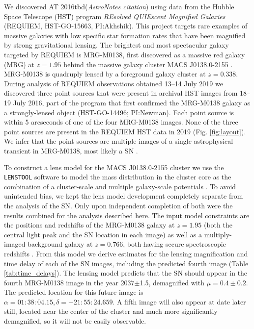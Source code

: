 \documentclass[12pt]{article}
\def\TNSname{AT 2016tbd\xspace}
\def\SNABC{AT 2016tbd\xspace}
\def\lenstool{{\tt LENSTOOL}\xspace}
\begin{document}
We discovered \SNABC ({\it AstroNotes citation})
using data from the Hubble Space Telescope (HST) program {\it REsolved QUIEscent Magnified Galaxies} (REQUIEM, HST-GO-15663, PI:Akhshik). This project targets rare examples of massive galaxies with low specific star formation rates that have been magnified by strong gravitational lensing. %
The brightest and most spectacular galaxy targeted by REQUIEM
is MRG-M0138, first discovered as a massive red galaxy (MRG) at $z=1.95$ \cite{newman_resolving_2018} behind the massive galaxy cluster MACS J0138.0-2155 \cite{ebeling_macs_2001}.
MRG-M0138 is quadruply lensed by a foreground galaxy cluster at $z=0.338$.  
During analysis of REQUIEM observations obtained 13--14 July 2019 \cite{materials_methods_2020} we discovered three point 
sources that were present in archival HST images from 18--19 July 2016, part of the program 
that first confirmed the MRG-M0138 galaxy as a strongly-lensed object (HST-GO-14496; PI:Newman). 
Each point source is within 5 arcseconds of one of the four MRG-M0138 images.  None of the
three point sources are present in the REQUIEM HST data in 2019 (Fig. \ref{fig:layout}). We infer that 
the point sources are multiple images of a single astrophysical 
transient in MRG-M0138, most likely a SN \cite{materials_methods_2020}.  

To construct a lens model for the MACS J0138.0-2155 cluster we use the \lenstool software \cite{jullo_bayesian_2007,kneib_lenstool_2011} to model the mass distribution in the cluster core as the combination of a cluster-scale and multiple galaxy-scale potentials \cite{materials_methods_2020}.  To avoid unintended bias, we kept the lens model development completely separate from the analysis of the SN.  Only upon independent completion of both were the results combined for the analysis described here.  The input model constraints are the positions and redshifts of the MRG-M0138 galaxy at $z=1.95$ (both the central light peak and the SN location in each image) as well as a multiply-imaged background 
galaxy at $z=0.766$, both having secure spectroscopic redshifts \cite{materials_methods_2020}.  
From this model we derive estimates for the lensing magnification and time delay of each of the SN images, including the predicted fourth image (Table \ref{tab:time_delays}).
The lensing model predicts that the SN should appear in the fourth MRG-M0138 image in the year 2037$\pm$1.5, demagnified with $\mu=0.4\pm0.2$. The predicted location for this future image is $\alpha=01:38:04.15,\delta=-21:55:24.659$.
A fifth image will also appear at date later still, located near the center of the cluster and much more significantly demagnified, so it will not be easily observable.  
 
\end{document}
